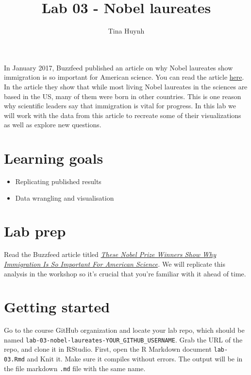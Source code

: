 \documentclass[
]{article}
\title{Lab 03 - Nobel laureates}
\author{Tina Huynh}
\date{}
\providecommand{\tightlist}{%
  \setlength{\itemsep}{0pt}\setlength{\parskip}{0pt}}
\begin{document}
\maketitle

{
\setcounter{tocdepth}{2}
\tableofcontents
}
In January 2017, Buzzfeed published an article on why Nobel laureates
show immigration is so important for American science. You can read the
article
\href{https://www.buzzfeednews.com/article/peteraldhous/immigration-and-science}{here}.
In the article they show that while most living Nobel laureates in the
sciences are based in the US, many of them were born in other countries.
This is one reason why scientific leaders say that immigration is vital
for progress. In this lab we will work with the data from this article
to recreate some of their visualizations as well as explore new
questions.

\section{Learning goals}\label{learning-goals}

\begin{itemize}
\tightlist
\item
  Replicating published results
\item
  Data wrangling and visualisation
\end{itemize}

\section{Lab prep}\label{lab-prep}

Read the Buzzfeed article titled
\href{https://www.buzzfeednews.com/article/peteraldhous/immigration-and-science}{\emph{These
Nobel Prize Winners Show Why Immigration Is So Important For American
Science}}\emph{.} We will replicate this analysis in the workshop so
it's crucial that you're familiar with it ahead of time.

\section{Getting started}\label{getting-started}

Go to the course GitHub organization and locate your lab repo, which
should be named \texttt{lab-03-nobel-laureates-YOUR\_GITHUB\_USERNAME}.
Grab the URL of the repo, and clone it in RStudio. First, open the R
Markdown document \texttt{lab-03.Rmd} and Knit it. Make sure it compiles
without errors. The output will be in the file markdown \texttt{.md}
file with the same name.
\end{document}
